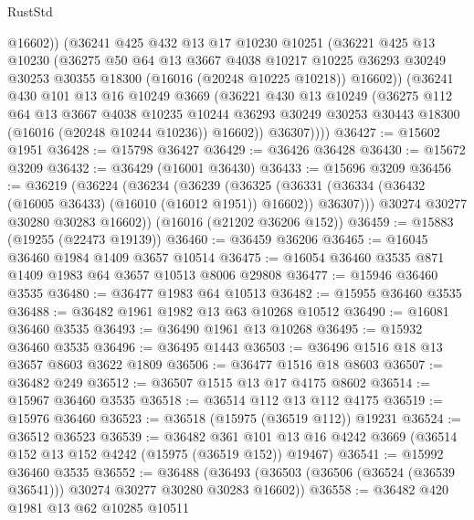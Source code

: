 \begin{lexlean}{RustStd}
\begin{coremodule}
            @16602))
        (@36241
          @425
          @432
          @13
          @17
          @10230
          @10251
          (@36221
            @425
            @13
            @10230
            (@36275
              @50
              @64
              @13
              @3667
              @4038
              @10217
              @10225
              @36293
              @30249
              @30253
              @30355
              @18300
              (@16016 (@20248 @10225 @10218))
              @16602))
          (@36241
            @430
            @101
            @13
            @16
            @10249
            @3669
            (@36221
              @430
              @13
              @10249
              (@36275
                @112
                @64
                @13
                @3667
                @4038
                @10235
                @10244
                @36293
                @30249
                @30253
                @30443
                @18300
                (@16016 (@20248 @10244 @10236))
                @16602))
            @36307))))
@36427 := @15602 @1951
@36428 := @15798 @36427
@36429 := @36426 @36428
@36430 := @15672 @3209
@36432 := @36429 (@16001 @36430)
@36433 := @15696 @3209
@36456 := @36219
    (@36224
      (@36234
        (@36239
          (@36325 (@36331 (@36334 (@36432 (@16005 @36433) (@16010 (@16012 @1951)) @16602)) @36307)))
        @30274
        @30277
        @30280
        @30283
        @16602))
    (@16016 (@21202 @36206 @152))
@36459 := @15883 (@19255 (@22473 @19139))
@36460 := @36459 @36206
@36465 := @16045 @36460 @1984 @1409 @3657 @10514
@36475 := @16054 @36460 @3535 @871 @1409 @1983 @64 @3657 @10513 @8006 @29808
@36477 := @15946 @36460 @3535
@36480 := @36477 @1983 @64 @10513
@36482 := @15955 @36460 @3535
@36488 := @36482 @1961 @1982 @13 @63 @10268 @10512
@36490 := @16081 @36460 @3535
@36493 := @36490 @1961 @13 @10268
@36495 := @15932 @36460 @3535
@36496 := @36495 @1443
@36503 := @36496 @1516 @18 @13 @3657 @8603 @3622 @1809
@36506 := @36477 @1516 @18 @8603
@36507 := @36482 @249
@36512 := @36507 @1515 @13 @17 @4175 @8602
@36514 := @15967 @36460 @3535
@36518 := @36514 @112 @13 @112 @4175
@36519 := @15976 @36460
@36523 := @36518 (@15975 (@36519 @112)) @19231
@36524 := @36512 @36523
@36539 := @36482
    @361
    @101
    @13
    @16
    @4242
    @3669
    (@36514 @152 @13 @152 @4242 (@15975 (@36519 @152)) @19467)
@36541 := @15992 @36460 @3535
@36552 := @36488
    (@36493 (@36503 (@36506 (@36524 (@36539 @36541))) @30274 @30277 @30280 @30283 @16602))
@36558 := @36482 @420 @1981 @13 @62 @10285 @10511

\end{coremodule}
\end{lexlean}
